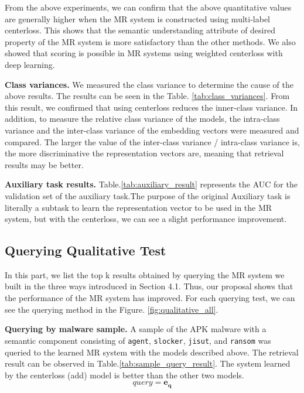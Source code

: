 From the above experiments, we can confirm that the above quantitative values ​​are generally higher when the MR system is constructed using multi-label centerloss. This shows that the semantic understanding attribute of desired property of the MR system is more satisfactory than the other methods. We also showed that scoring is possible in MR systems using weighted centerloss with deep learning.

\textbf{Class variances. }
We measured the class variance to determine the cause of the above results. The results can be seen in the Table. \ref{tab:class_variances}. From this result, we confirmed that using centerloss reduces the inner-class variance. In addition, to measure the relative class variance of the models, the intra-class variance and the inter-class variance of the embedding vectors were measured and compared. The larger the value of the inter-class variance / intra-class variance is, the more discriminative the representation vectors are, meaning that retrieval results may be better.

\textbf{Auxiliary task results. }
Table.\ref{tab:auxiliary_result} represents the AUC for the validation set of the auxiliary task.The purpose of the original Auxiliary task is literally a subtask to learn the representation vector to be used in the MR system, but with the centerloss, we can see a slight performance improvement.


\subsection{Querying Qualitative Test}
In this part, we list the top k results obtained by querying the MR system we built in the three ways introduced in Section 4.1. Thus, our proposal shows that the performance of the MR system has improved. For each querying test, we can see the querying method in the Figure. \ref{fig:qualitative_all}.

\textbf{Querying by malware sample. }
A sample of the APK malware with a semantic component consisting of \texttt{agent}, \texttt{slocker}, \texttt{jisut}, and \texttt{ransom} was queried to the learned MR system with the models described above. The retrieval result can be observed in Table.\ref{tab:sample_query_result}. The system learned by the centerloss (add) model is better than the other two models.
\[
   query = \mathbf{e_q} 
\]


